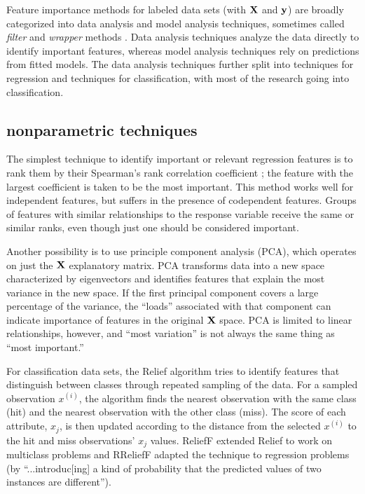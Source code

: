 \documentclass[11pt]{article}
\renewcommand{\xi}{x^{(i)}}
\begin{document}
Feature importance methods for labeled data sets (with $\bf X$ and $\bf y$) are broadly categorized into data analysis and model analysis techniques, sometimes called {\em filter} and {\em wrapper} methods \citep{tsanas}. Data analysis techniques analyze the data directly to identify important features, whereas model analysis techniques rely on predictions from fitted models.  The data analysis techniques further split into techniques for regression and techniques for classification, with most of the research going into classification.

\subsection{nonparametric techniques}

The simplest technique to identify important or relevant regression features is to rank them by their Spearman's rank correlation coefficient \citep{spearmans}; the feature with the largest coefficient is taken to be the most important. This method works well for independent features, but suffers in the presence of codependent features.   Groups of features with similar relationships to the response variable receive the same or similar ranks, even though just one should be considered important.

Another possibility is to use principle component analysis (PCA), which operates on just the $\bf X$ explanatory matrix. PCA transforms data into a new space characterized by eigenvectors and identifies features that explain the most variance in the new space. If the first principal component covers a large percentage of the variance, the ``loads'' associated with that component can indicate importance of features in the original $\bf X$ space. PCA is limited to linear relationships, however, and ``most variation'' is not always the same thing as ``most important.''

For classification data sets, the Relief algorithm \citep{relief} tries to identify features that distinguish between classes through repeated sampling of the data. For a sampled observation $\xi$, the algorithm finds the nearest observation with the same class (hit) and the nearest observation with the other class (miss). The score of each attribute, $x_j$, is then updated according to the distance from the selected $\xi$ to the hit and miss observations'  $x_j$ values. ReliefF \citep{ReliefF} extended Relief to work on multiclass problems and RReliefF \citep{RReliefF} adapted the technique to regression problems (by ``...introduc[ing] a kind of probability that the predicted values of two instances are different'').
\end{document}
